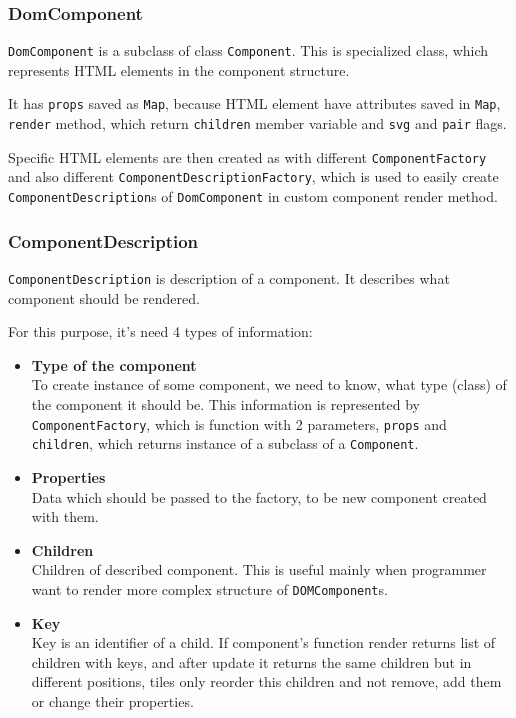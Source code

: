     \subsubsection{DomComponent}\label{subsubsec:our-architecture-core-dom-component}
      \texttt{DomComponent} is a subclass of class \texttt{Component}. 
      This is specialized class, which represents HTML elements in the component structure.

      It has \texttt{props} saved as \texttt{Map}, because HTML element have attributes saved in \texttt{Map},
      \texttt{render} method, which return \texttt{children} member variable and \texttt{svg} and \texttt{pair} flags.

      Specific HTML elements are then created as with different \texttt{ComponentFactory} and also different \texttt{ComponentDescriptionFactory}, 
      which is used to easily create \texttt{ComponentDescription}s of \texttt{DomComponent} in custom component render method. 

    \subsubsection{ComponentDescription}\label{subsubsec:our-architecture-core-component-description}
      \texttt{ComponentDescription} is description of a component. 
      It describes what component should be rendered.

      For this purpose, it's need 4 types of information:
      \begin{itemize}
        \item \textbf{Type of the component} \hfill \\
          To create instance of some component, we need to know, what type (class) of the component it should be. 
          This information is represented by \texttt{ComponentFactory}, 
          which is function with 2 parameters, \texttt{props} and \texttt{children}, 
          which returns instance of a subclass of a \texttt{Component}.
        \item \textbf{Properties} \hfill \\
          Data which should be passed to the factory, to be new component created with them.
        \item \textbf{Children} \hfill \\
          Children of described component.  
          This is useful mainly when programmer want to render more complex structure of \texttt{DOMComponent}s.
        \item \textbf{Key} \hfill \\
          Key is an identifier of a child. If component's function render returns list of children with keys, 
          and after update it returns the same children but in different positions, 
          tiles only reorder this children and not remove, add them or change their properties. 
      \end{itemize}

